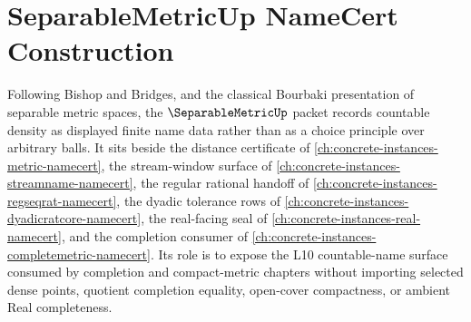 \chapter{SeparableMetricUp NameCert Construction}
\label{ch:concrete-instances-separablemetric-namecert}

Following Bishop and Bridges, and the classical Bourbaki presentation of separable metric spaces, the $\SeparableMetricUp$ packet records countable density as displayed finite name data rather than as a choice principle over arbitrary balls. It sits beside the distance certificate of \autoref{ch:concrete-instances-metric-namecert}, the stream-window surface of \autoref{ch:concrete-instances-streamname-namecert}, the regular rational handoff of \autoref{ch:concrete-instances-regseqrat-namecert}, the dyadic tolerance rows of \autoref{ch:concrete-instances-dyadicratcore-namecert}, the real-facing seal of \autoref{ch:concrete-instances-real-namecert}, and the completion consumer of \autoref{ch:concrete-instances-completemetric-namecert}. Its role is to expose the L10 countable-name surface consumed by completion and compact-metric chapters without importing selected dense points, quotient completion equality, open-cover compactness, or ambient Real completeness.

